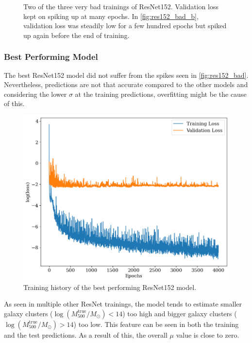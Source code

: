 \begin{figure}[H]
\begin{subfigure}{.46\textwidth}
\caption{} 
\label{fig:res152_bad_b}
\end{subfigure}
\caption{Two of the three very bad trainings of ResNet152. Validation loss kept on spiking up at many epochs. In \autoref{fig:res152_bad_b}, validation loss was steadily low for a few hundred epochs but spiked up again before the end of training.}
\label{fig:res152_bad}
\end{figure}


\subsubsection*{Best Performing Model}
The best ResNet152 model did not suffer from the spikes seen in \autoref{fig:res152_bad}. Nevertheless, predictions are not that accurate compared to the other models and considering the lower $\sigma$ at the training predictions, overfitting might be the cause of this.


\begin{figure}[H]
\centering
\includegraphics[width=.667\textwidth]{images/Chapter4/Res152/res152_history.png}
\caption{Training history of the best performing ResNet152 model.} 
\label{fig:resnet152_best_history}
\end{figure}

As seen in multiple other ResNet trainings, the model tends to estimate smaller galaxy clusters ($\log{(M_{500}^{\text{true}}/M_{\odot})} < 14$) too high and bigger galaxy clusters ($\log{(M_{500}^{\text{true}}/M_{\odot})} > 14$) too low. This feature can be seen in both the training and the test predictions. As a result of this, the overall $\mu$ value is close to zero.


